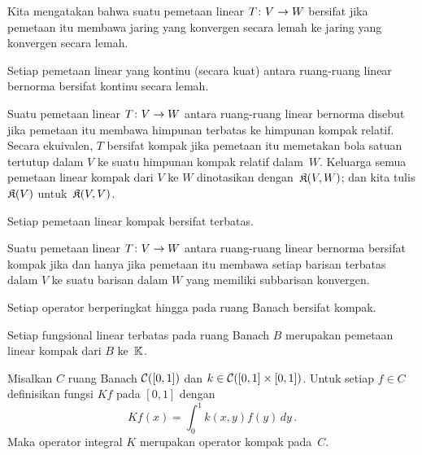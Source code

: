 \begin{defn} Kita mengatakan bahwa suatu pemetaan linear $T\colon V \rightarrow W$ bersifat
 jika pemetaan itu membawa jaring yang konvergen secara lemah ke jaring yang konvergen secara lemah.
\end{defn}

\begin{prop} Setiap pemetaan linear yang kontinu (secara kuat) antara ruang-ruang linear bernorma bersifat kontinu secara lemah.
\end{prop}

\begin{defn} Suatu pemetaan linear $T\colon V \rightarrow W$ antara ruang-ruang linear bernorma disebut
 jika pemetaan itu membawa himpunan terbatas ke himpunan kompak relatif. Secara ekuivalen, $T$ bersifat kompak jika pemetaan itu
memetakan bola satuan tertutup dalam $V$ ke suatu himpunan kompak relatif dalam~$W$.   Keluarga semua pemetaan linear kompak
dari $V$ ke $W$ dinotasikan
dengan~$\mathfrak{K}(V,W)$; dan kita tulis $\mathfrak{K}(V)$ untuk~$\mathfrak{K}(V,V)$.
\end{defn}

\begin{prop} Setiap pemetaan linear kompak bersifat terbatas.
\end{prop}

\begin{prop} Suatu pemetaan linear $T\colon V \rightarrow W$ antara ruang-ruang linear bernorma bersifat kompak jika dan hanya jika pemetaan itu membawa
setiap barisan terbatas dalam $V$ ke suatu barisan dalam $W$ yang memiliki subbarisan konvergen.
\end{prop}

\begin{exam} Setiap operator berperingkat hingga pada ruang Banach bersifat kompak.
\end{exam}

\begin{exam} Setiap fungsional linear terbatas pada ruang Banach $B$ merupakan pemetaan linear kompak dari $B$ ke~$\mathbb{K}$.
\end{exam}

\begin{exam} Misalkan $C$ ruang Banach $\mathcal{C}([0,1])$ dan $k \in \mathcal{C}([0,1] \times [0,1])$.  Untuk setiap $f \in C$
definisikan fungsi $Kf$ pada $[0,1]$ dengan
   \[ Kf(x) = \int_0^1 k(x,y)f(y)\,dy\,. \]
Maka operator integral $K$ merupakan operator kompak pada~$C$.
\end{exam}


